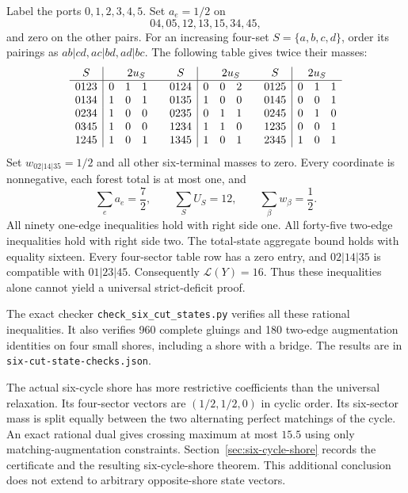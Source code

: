 Label the ports $0,1,2,3,4,5$.
Set $a_e=1/2$ on
\[
 04,05,12,13,15,34,45,
\]
and zero on the other pairs.
For an increasing four-set $S=\{a,b,c,d\}$, order its pairings as $ab|cd,ac|bd,ad|bc$.
The following table gives twice their masses:
\[
\begin{array}{c|ccc@{\qquad}c|ccc@{\qquad}c|ccc}
 S&\multicolumn{3}{c}{2u_S}&S&\multicolumn{3}{c}{2u_S}&S&\multicolumn{3}{c}{2u_S}\\\hline
0123&0&1&1&0124&0&0&2&0125&0&1&1\\
0134&1&0&1&0135&1&0&0&0145&0&0&1\\
0234&1&0&0&0235&0&1&1&0245&0&1&0\\
0345&1&0&0&1234&1&1&0&1235&0&0&1\\
1245&1&0&1&1345&1&0&1&2345&1&0&1
\end{array}
\]
Set $w_{02|14|35}=1/2$ and all other six-terminal masses to zero.
Every coordinate is nonnegative, each forest total is at most one, and
\[
 \sum_ea_e=\frac72,\qquad
 \sum_SU_S=12,\qquad
 \sum_\beta w_\beta=\frac12.
\]
All ninety one-edge inequalities hold with right side one.
All forty-five two-edge inequalities hold with right side two.
The total-state aggregate bound holds with equality sixteen.
Every four-sector table row has a zero entry, and $02|14|35$ is compatible with $01|23|45$.
Consequently $\mathcal L(Y)=16$.
Thus these inequalities alone cannot yield a universal strict-deficit proof.

The exact checker \texttt{check\_six\_cut\_states.py} verifies all these rational inequalities.
It also verifies 960 complete gluings and 180 two-edge augmentation identities on four small shores, including a shore with a bridge.
The results are in \texttt{six-cut-state-checks.json}.

The actual six-cycle shore has more restrictive coefficients than the universal relaxation.
Its four-sector vectors are $(1/2,1/2,0)$ in cyclic order.
Its six-sector mass is split equally between the two alternating perfect matchings of the cycle.
An exact rational dual gives crossing maximum at most $15.5$ using only matching-augmentation constraints.
Section~\ref{sec:six-cycle-shore} records the certificate and the resulting six-cycle-shore theorem.
This additional conclusion does not extend to arbitrary opposite-shore state vectors.
